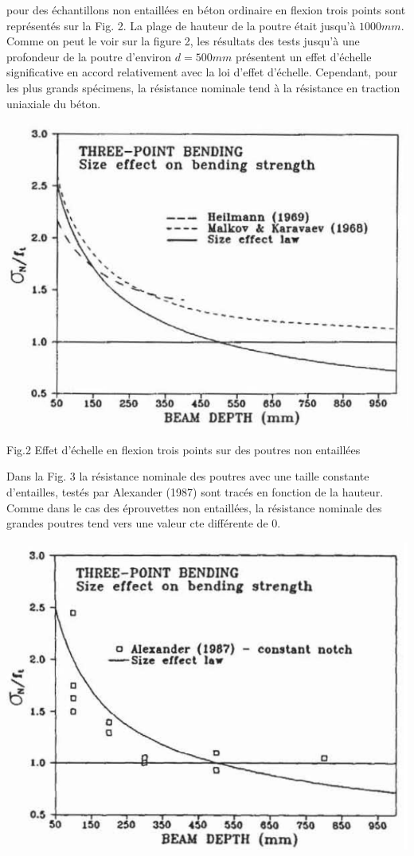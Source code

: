 \documentclass{DGC_M2_report}
\begin{document}
pour des échantillons non entaillées en béton ordinaire en flexion trois points sont représentés sur
la Fig. 2. La plage de hauteur de la poutre était jusqu'à $1000 mm$. Comme on peut le voir sur la
figure 2, les résultats des tests jusqu'à une profondeur de la poutre d'environ $d = 500 mm$
présentent un effet d'échelle significative en accord relativement avec la loi d'effet d'échelle.
Cependant, pour les plus grands spécimens, la résistance nominale tend à la résistance en traction
uniaxiale du béton.
\begin{center}
\includegraphics[scale=0.65]{Fig_2}
\end{center}
\begin{center}
\caption{Fig.2 Effet d'échelle en flexion trois points sur des poutres non entaillées}
\end{center}
Dans la Fig. 3 la résistance nominale des poutres avec une taille constante d'entailles,
testés par Alexander (1987) sont tracés en fonction de la hauteur. Comme dans le cas des
éprouvettes non entaillées, la résistance nominale des grandes poutres tend vers une valeur
cte différente de $0$.
\begin{center}
\includegraphics[scale=0.65]{Fig_3}
\end{center}
\end{document}
